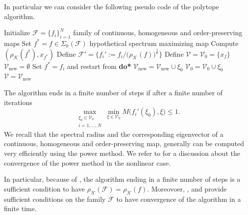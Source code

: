 \documentclass{article}
\newcommand{\family}{\mathcal{F}}
\newcommand{\cradius}{\rho_{\cone}}
\newcommand{\cone}{\mathcal{K}}
\begin{document}
In particular we can consider the following pseudo code of the polytope algorithm.

\begin{algorithm}
    \caption{}\label{your_label}
    \begin{algorithmic}
        \STATE Initialize $\family=\{f_i\}_{i=1}^N$ family of continuous, homogeneous and order-preserving maps
        \STATE  Set $f^*=f\in \Sigma_k(\family)$ hypothetical spectrum maximizing map
        \STATE  Compute $(\cradius(f^*), x_{f^*})$
        \STATE  Define ${\family}'=\{f_i':=f_i/\big(\cradius(f)\big)^{\frac{1}{k}}\}$
        \STATE Define $\mathcal{V}=\mathcal{V}_0=\{x_f\}$
        \STATE $\mathcal{V}_{\text{new}}= \emptyset$
                   \STATE Set $f^*=f_i$ and restart from {\textbf{do*}}
                \ENDIF
                   \STATE $\mathcal{V}_{\text{new}}=\mathcal{V}_{\text{new}}\cup \xi_0$
                   \STATE $\mathcal{V}_{0}=\mathcal{V}_{0}\cup \xi_0$
                \ENDIF
            \ENDFOR
        \ENDFOR
        \STATE $\mathcal{V}=\mathcal{V}_{\text{new}}$
        \ENDWHILE
    \end{algorithmic}
\end{algorithm}



The algorithm ends in a finite number of steps if after a finite number of iterations 
\begin{equation}
    \max_{\substack{\xi_0\in \mathcal{V}_0\\i=1,\dots,N}}\min_{\xi\in \mathcal{V}_0}M\big(f_i'(\xi_0),\xi)\leq 1.
\end{equation}
%
We recall that the spectral radius and the corresponding eigenvector of a continuous, homogeneous and order-preserving map, generally can be computed very efficiently using the power method. We refer to \cite{lemmens2012nonlinear} for a discussion about the convergence of the power method in the nonlinear case.
%

In particular, because of , the algorithm ending in a finite number of steps is a sufficient condition to have $\cradius(\family)=\cradius(f)$.
%
Moreovoer, ,  and  provide sufficient conditions on the family $\family$ to have convergence of the algorithm in a finite time.
%
\end{document}

